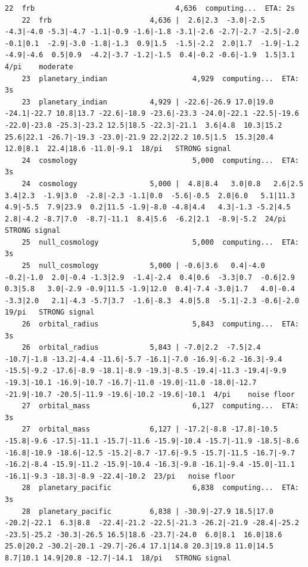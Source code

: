 \documentclass[11pt, letterpaper, openany]{book}
\begin{document}
\begin{empiricalbox}
\begin{lstlisting}[style=terminal]
    22  frb                                 4,636  computing...  ETA: 2s
    22  frb                       4,636 |  2.6|2.3  -3.0|-2.5 -4.3|-4.0 -5.3|-4.7 -1.1|-0.9 -1.6|-1.8 -3.1|-2.6 -2.7|-2.7 -2.5|-2.0 -0.1|0.1  -2.9|-3.0 -1.8|-1.3  0.9|1.5  -1.5|-2.2  2.0|1.7  -1.9|-1.2 -4.9|-4.6  0.5|0.9  -4.2|-3.7 -1.2|-1.5  0.4|-0.2 -0.6|-1.9  1.5|3.1   4/pi    moderate
    23  planetary_indian                    4,929  computing...  ETA: 3s
    23  planetary_indian          4,929 | -22.6|-26.9 17.0|19.0 -24.1|-22.7 10.8|13.7 -22.6|-18.9 -23.6|-23.3 -24.0|-22.1 -22.5|-19.6 -22.0|-23.8 -25.3|-23.2 12.5|18.5 -22.3|-21.1  3.6|4.8  10.3|15.2 25.6|22.1 -26.7|-19.3 -23.0|-21.9 22.2|22.2 10.5|1.5  15.3|20.4 12.0|8.1  22.4|18.6 -11.0|-9.1  18/pi   STRONG signal
    24  cosmology                           5,000  computing...  ETA: 3s
    24  cosmology                 5,000 |  4.8|8.4   3.0|0.8   2.6|2.5   3.4|2.3  -1.9|3.0  -2.8|-2.3 -1.1|0.0  -5.6|-0.5  2.0|6.0   5.1|11.3  4.9|-5.5  7.9|23.9  0.2|11.5 -1.9|-8.0 -4.8|4.4   4.3|-1.3 -5.2|4.5   2.8|-4.2 -8.7|7.0  -8.7|-11.1  8.4|5.6  -6.2|2.1  -8.9|-5.2  24/pi   STRONG signal
    25  null_cosmology                      5,000  computing...  ETA: 3s
    25  null_cosmology            5,000 | -0.6|3.6   0.4|-4.0 -0.2|-1.0  2.0|-0.4 -1.3|2.9  -1.4|-2.4  0.4|0.6  -3.3|0.7  -0.6|2.9   0.3|5.8   3.0|-2.9 -0.9|11.5 -1.9|12.0  0.4|-7.4 -3.0|1.7   4.0|-0.4 -3.3|2.0   2.1|-4.3 -5.7|3.7  -1.6|-8.3  4.0|5.8  -5.1|-2.3 -0.6|-2.0  19/pi   STRONG signal
    26  orbital_radius                      5,843  computing...  ETA: 3s
    26  orbital_radius            5,843 | -7.0|2.2  -7.5|2.4  -10.7|-1.8 -13.2|-4.4 -11.6|-5.7 -16.1|-7.0 -16.9|-6.2 -16.3|-9.4 -15.5|-9.2 -17.6|-8.9 -18.1|-8.9 -19.3|-8.5 -19.4|-11.3 -19.4|-9.9 -19.3|-10.1 -16.9|-10.7 -16.7|-11.0 -19.0|-11.0 -18.0|-12.7 -21.9|-10.7 -20.5|-11.9 -19.6|-10.2 -19.6|-10.1  4/pi    noise floor
    27  orbital_mass                        6,127  computing...  ETA: 3s
    27  orbital_mass              6,127 | -17.2|-8.8 -17.8|-10.5 -15.8|-9.6 -17.5|-11.1 -15.7|-11.6 -15.9|-10.4 -15.7|-11.9 -18.5|-8.6 -16.8|-10.9 -18.6|-12.5 -15.2|-8.7 -17.6|-9.5 -15.7|-11.5 -16.7|-9.7 -16.2|-8.4 -15.9|-11.2 -15.9|-10.4 -16.3|-9.8 -16.1|-9.4 -15.0|-11.1 -16.1|-9.3 -18.3|-8.9 -22.4|-10.2  23/pi   noise floor
    28  planetary_pacific                   6,838  computing...  ETA: 3s
    28  planetary_pacific         6,838 | -30.9|-27.9 18.5|17.0 -20.2|-22.1  6.3|8.8  -22.4|-21.2 -22.5|-21.3 -26.2|-21.9 -28.4|-25.2 -23.5|-25.2 -30.3|-26.5 16.5|18.6 -23.7|-24.0  6.0|8.1  16.0|18.6 25.0|20.2 -30.2|-20.1 -29.7|-26.4 17.1|14.8 20.3|19.8 11.0|14.5  8.7|10.1 14.9|20.8 -12.7|-14.1  18/pi   STRONG signal

\end{lstlisting}
\end{empiricalbox}
\end{document}
